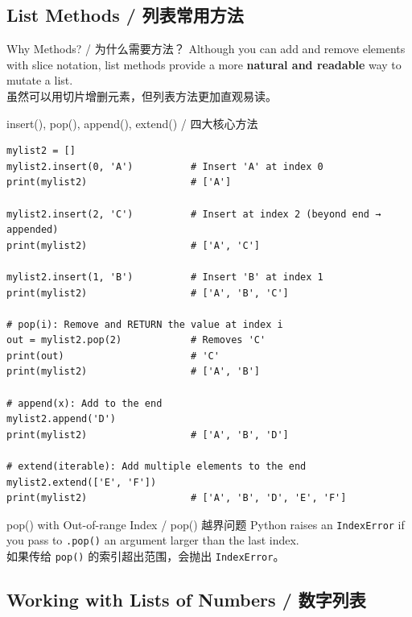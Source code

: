\documentclass[11pt,a4paper]{article}
\begin{document}
\subsection{List Methods / 列表常用方法}

\begin{concept}{Why Methods? / 为什么需要方法？}
    Although you can add and remove elements with slice notation, list methods provide a more \textbf{natural and readable} way to mutate a list. \\
    虽然可以用切片增删元素，但列表方法更加直观易读。
\end{concept}

\begin{examplebox}{insert(), pop(), append(), extend() / 四大核心方法}
\begin{lstlisting}
mylist2 = []
mylist2.insert(0, 'A')          # Insert 'A' at index 0
print(mylist2)                  # ['A']

mylist2.insert(2, 'C')          # Insert at index 2 (beyond end → appended)
print(mylist2)                  # ['A', 'C']

mylist2.insert(1, 'B')          # Insert 'B' at index 1
print(mylist2)                  # ['A', 'B', 'C']

# pop(i): Remove and RETURN the value at index i
out = mylist2.pop(2)            # Removes 'C'
print(out)                      # 'C'
print(mylist2)                  # ['A', 'B']

# append(x): Add to the end
mylist2.append('D')
print(mylist2)                  # ['A', 'B', 'D']

# extend(iterable): Add multiple elements to the end
mylist2.extend(['E', 'F'])
print(mylist2)                  # ['A', 'B', 'D', 'E', 'F']
\end{lstlisting}
\end{examplebox}

\begin{warning}{pop() with Out-of-range Index / pop() 越界问题}
    Python raises an \texttt{IndexError} if you pass to \texttt{.pop()} an argument larger than the last index. \\
    如果传给 \texttt{pop()} 的索引超出范围，会抛出 \texttt{IndexError}。
\end{warning}

\subsection{Working with Lists of Numbers / 数字列表}
\end{document}
